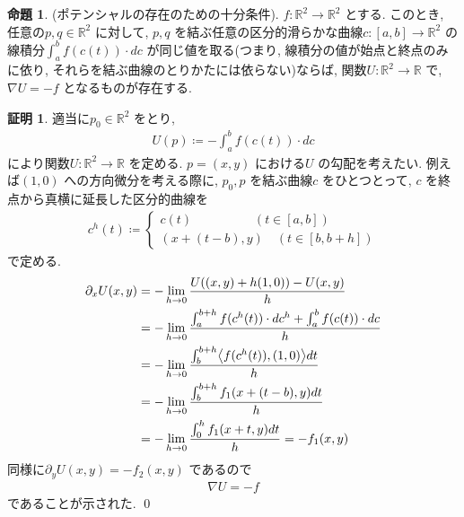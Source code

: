 \documentclass[10pt, fleqn, label-section=none]{bxjsarticle}
\theoremstyle{definition}
\newtheorem{prop}[dfn]{命題}
\newtheorem*{pf*}{証明}
\newcommand{\tbra}[1]{\mleft\langle#1\mright\rangle}
\renewcommand{\;}{\, ; \,}
\begin{document}
\begin{prop}(ポテンシャルの存在のための十分条件). $f: \mathbb R^2 \rightarrow \mathbb R^2$ とする. このとき,  
任意の$p, q \in \mathbb R^2$ に対して, $p,q$ を結ぶ任意の区分的滑らかな曲線$c:[a,b] \rightarrow \mathbb R^2$ の線積分$\int_a^b f(c(t)) \cdot dc$ が同じ値を取る(つまり, 線積分の値が始点と終点のみに依り, それらを結ぶ曲線のとりかたには依らない)ならば, 関数$U: \mathbb R^2 \rightarrow \mathbb R$ で, $\nabla U = - f $ となるものが存在する. 
\end{prop}
\begin{pf*}適当に$p_0 \in \mathbb R^2$ をとり, 
\begin{align*} U(p) \coloneqq -  \int_a^b f(c(t)) \cdot dc \end{align*}
により関数$U: \mathbb R^2 \rightarrow \mathbb R$ を定める. $p = (x,y)$ における$U$ の勾配を考えたい. 例えば$(1,0)$ への方向微分を考える際に, $p_0, p$ を結ぶ曲線$c$ をひとつとって, $c$ を終点から真横に延長した区分的曲線を
\begin{align*}  c^h (t)  \coloneqq \begin{cases} c(t) \hspace{59pt}(t \in [a,b]) \\ (x + (t-b) , y) \quad (t \in [b, b+h]) \end{cases} \end{align*}
で定める. 
\begin{align*} \partial_x U(x,y) &= - \lim_{h \rightarrow 0} \frac{U((x,y) + h(1,0) ) - U(x,y) }{h }
\\&= - \lim_{h \rightarrow 0} \frac{\int_a^{b +h} f(c^h(t)) \cdot dc^h + \int_a^{b} f(c(t)) \cdot dc }{h} 
 \\&= - \lim_{h \rightarrow 0} \frac{\int_b^{b +h} \tbra{f(c^h (t)), (1,0)} dt}{h} \\&= -  \lim_{h \rightarrow 0} \frac{\int_b^{b +h} f_1 (x + (t-b), y)  dt}{h}\\&= -  \lim_{h \rightarrow 0} \frac{\int_0^{h} f_1 (x + t, y)  dt}{h} = - f_1 (x, y)\end{align*}
同様に$\partial_y U (x,y) = - f_2 (x,y)$ であるので
\begin{align*} \nabla U = - f \end{align*}
であることが示された.
\qed
\end{pf*}
\end{document}
